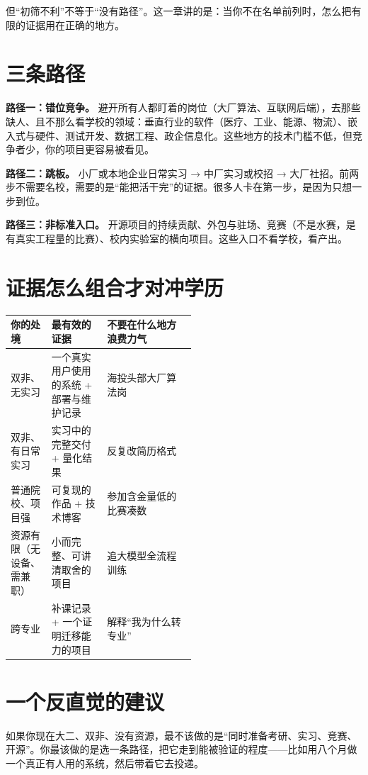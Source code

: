 \documentclass[UTF8,zihao=5,openany]{ctexbook}
\begin{document}
但“初筛不利”不等于“没有路径”。这一章讲的是：当你不在名单前列时，怎么把有限的证据用在正确的地方。

\section{三条路径}
\textbf{路径一：错位竞争。} 避开所有人都盯着的岗位（大厂算法、互联网后端），去那些缺人、且不那么看学校的领域：垂直行业的软件（医疗、工业、能源、物流）、嵌入式与硬件、测试开发、数据工程、政企信息化。这些地方的技术门槛不低，但竞争者少，你的项目更容易被看见。

\textbf{路径二：跳板。} 小厂或本地企业日常实习 → 中厂实习或校招 → 大厂社招。前两步不需要名校，需要的是“能把活干完”的证据。很多人卡在第一步，是因为只想一步到位。

\textbf{路径三：非标准入口。} 开源项目的持续贡献、外包与驻场、竞赛（不是水赛，是有真实工程量的比赛）、校内实验室的横向项目。这些入口不看学校，看产出。

\section{证据怎么组合才对冲学历}
\begin{center}\small
\begin{tabularx}{\linewidth}{p{0.22\linewidth}p{0.30\linewidth}Y}
\toprule
你的处境 & 最有效的证据 & 不要在什么地方浪费力气 \\
\midrule
双非、无实习 & 一个真实用户使用的系统 + 部署与维护记录 & 海投头部大厂算法岗 \\
双非、有日常实习 & 实习中的完整交付 + 量化结果 & 反复改简历格式 \\
普通院校、项目强 & 可复现的作品 + 技术博客 & 参加含金量低的比赛凑数 \\
资源有限（无设备、需兼职） & 小而完整、可讲清取舍的项目 & 追大模型全流程训练 \\
跨专业 & 补课记录 + 一个证明迁移能力的项目 & 解释“我为什么转专业” \\
\bottomrule
\end{tabularx}
\end{center}

\section{一个反直觉的建议}
如果你现在大二、双非、没有资源，最不该做的是“同时准备考研、实习、竞赛、开源”。你最该做的是选一条路径，把它走到能被验证的程度——比如用八个月做一个真正有人用的系统，然后带着它去投递。
\end{document}
